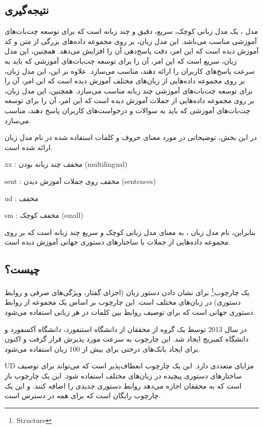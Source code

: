 \subsection{نتیجه‌گیری}

مدل ،  یک مدل زبانی کوچک، سریع، دقیق و چند زبانه است که برای توسعه چت‌بات‌های آموزشی مناسب می‌باشد. این مدل زبان، بر روی مجموعه داده‌های بزرگی از متن و کد آموزش دیده است که این امر، دقت پاسخ‌دهی آن را افزایش می‌دهد. همچنین، این مدل زبان، سریع است که این امر، آن را برای توسعه چت‌بات‌های آموزشی که باید به سرعت پاسخ‌های کاربران را ارائه دهند، مناسب می‌سازد. علاوه بر این، این مدل زبان، بر روی مجموعه داده‌هایی از زبان‌های مختلف آموزش دیده است که این امر، آن را برای توسعه چت‌بات‌های آموزشی چند زبانه مناسب می‌سازد. همچنین، این مدل زبان، بر روی مجموعه داده‌هایی از جملات آموزش دیده است که این امر، آن را برای توسعه چت‌بات‌های آموزشی که باید به سوالات و درخواست‌های کاربران پاسخ دهند، مناسب می‌سازد.

در این بخش، توضیحاتی در مورد معنای حروف و کلمات استفاده شده در نام مدل زبان  ارائه شده است.

xx : مخفف چند زبانه بودن (multilingual)

sent : مخفف روی جملات آموزش دیدن (sentences)

ud : مخفف 

sm : مخفف کوچک (small)

بنابراین، نام مدل زبان ، به معنای مدل زبانی کوچک و سریع چند زبانه است که بر روی مجموعه داده‌هایی از جملات با ساختارهای دستوری جهانی آموزش دیده است.

\subsection{ چیست؟}
یک چارچوب\footnote{Structure} برای نشان دادن دستور زبان (اجزای گفتار، ویژگی‌های صرفی و روابط دستوری) در زبان‌های مختلف است. این چارچوب بر اساس یک مجموعه از روابط دستوری جهانی است که برای توصیف روابط بین کلمات در هر زبانی استفاده می‌شود.

 \cite{2} در سال 2013 توسط یک گروه از محققان از دانشگاه استنفورد، دانشگاه آکسفورد و دانشگاه کمبریج ایجاد شد. این چارچوب به سرعت مورد پذیرش قرار گرفت و اکنون برای ایجاد بانک‌های درختی برای بیش از 100 زبان استفاده می‌شود.

UD مزایای متعددی دارد. این یک چارچوب انعطاف‌پذیر است که می‌تواند برای توصیف ساختارهای دستوری پیچیده در زبان‌های مختلف استفاده شود. این یک چارچوب باز است که به محققان اجازه می‌دهد روابط دستوری جدیدی را اضافه کنند. و این یک چارچوب رایگان است که برای همه در دسترس است.


